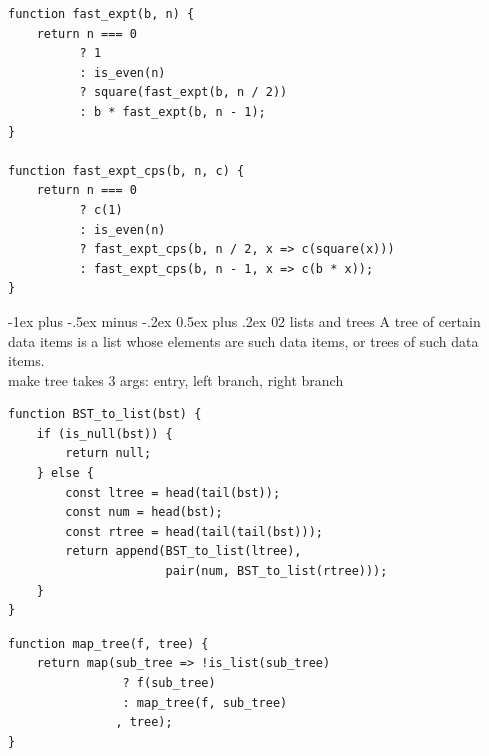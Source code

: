 \documentclass[10pt, landscape]{article}
\makeatletter
\renewcommand{\section}{\@startsection{section}{1}{0mm}%
                                {-1ex plus -.5ex minus -.2ex}%
                                {0.5ex plus .2ex}%
                                {\normalfont\large\bfseries}}
\makeatother
\begin{document}
\begin{multicols}{4}
\begin{verbatim}
function fast_expt(b, n) {
    return n === 0
          ? 1
          : is_even(n)
          ? square(fast_expt(b, n / 2))
          : b * fast_expt(b, n - 1);
}

function fast_expt_cps(b, n, c) {
    return n === 0
          ? c(1)
          : is_even(n)
          ? fast_expt_cps(b, n / 2, x => c(square(x)))
          : fast_expt_cps(b, n - 1, x => c(b * x));
}
\end{verbatim}

\section{02 lists and trees}
A tree of certain data items is a list whose elements are such data items, or trees of such data items. \\
make tree takes 3 args: entry, left branch, right branch
\begin{verbatim}
function BST_to_list(bst) {
    if (is_null(bst)) {
        return null;
    } else {
        const ltree = head(tail(bst));
        const num = head(bst);
        const rtree = head(tail(tail(bst)));
        return append(BST_to_list(ltree),
                      pair(num, BST_to_list(rtree)));
    }
}
\end{verbatim}

\begin{verbatim}
function map_tree(f, tree) {
    return map(sub_tree => !is_list(sub_tree)
                ? f(sub_tree)
                : map_tree(f, sub_tree)
               , tree);
}
\end{verbatim}


\end{multicols}
\end{document}
